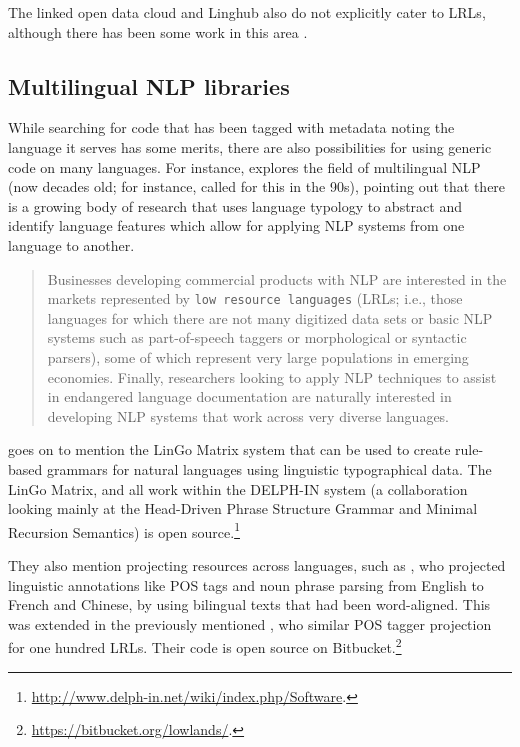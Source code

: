 The linked open data cloud and Linghub also do not explicitly cater to LRLs, although there has been some work in this area \citep{huang2017linking}.

\subsection{Multilingual NLP libraries}
\label{subsec:popular-open-source-libraries}

While searching for code that has been tagged with metadata noting the language it serves has some merits, there are also possibilities for using generic code on many languages. For instance, \citet{bender2016linguistic} explores the field of multilingual NLP (now decades old; for instance, \citet{kay1997proper} called for this in the 90s), pointing out that there is a growing body of research that uses language typology to abstract and identify language features which allow for applying NLP systems from one language to another.

\begin{quote}
Businesses developing commercial products with NLP are interested in the markets represented by {\tt low resource languages} (LRLs; i.e., those languages for which there are not many digitized data sets or basic NLP systems such as part-of-speech taggers or morphological or syntactic parsers), some of which represent very large populations in emerging economies. Finally, researchers looking to apply NLP techniques to assist in endangered language documentation are naturally interested in developing NLP systems that work across very diverse languages.\citep[646]{bender2016linguistic}
\end{quote}

\citet{bender2016linguistic} goes on to mention the LinGo Matrix system \citep{bender2002grammar, drellishak2005coordination} that can be used to create rule-based grammars for natural languages using linguistic typographical data. The LinGo Matrix, and all work within the DELPH-IN system (a collaboration looking mainly at the Head-Driven Phrase Structure Grammar and Minimal Recursion Semantics) is open source.\footnote{\href{http://www.delph-in.net/wiki/index.php/Software}{http://www.delph-in.net/wiki/index.php/Software}. }

They also mention projecting resources across languages, such as \citet{yarowsky2001inducing}, who projected linguistic annotations like POS tags and noun phrase parsing from English to French and Chinese, by using bilingual texts that had been word-aligned. This was extended in the previously mentioned \citet{agic2015if}, who similar POS tagger projection for one hundred LRLs. Their code is open source on Bitbucket.\footnote{\href{https://bitbucket.org/lowlands/}{https://bitbucket.org/lowlands/}. }

